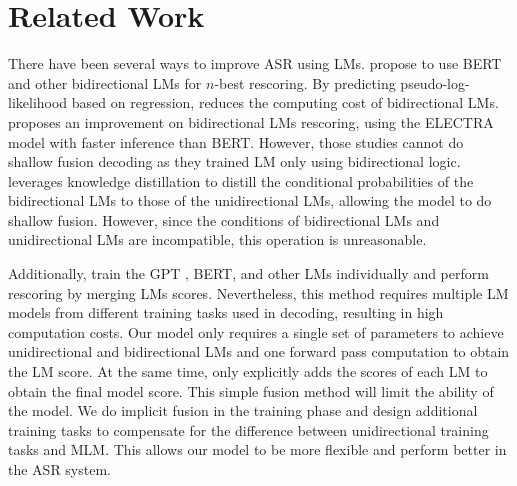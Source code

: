 \section{Related Work}
There have been several ways to improve ASR using LMs. \cite{ref39,ref50} propose to use BERT \cite{ref7} and other bidirectional LMs for $n$-best rescoring. By predicting pseudo-log-likelihood based on regression, \cite{ref38} reduces the computing cost of bidirectional LMs. \cite{ref9} proposes an improvement on bidirectional LMs rescoring, using the ELECTRA model with faster inference than BERT. However, those studies cannot do shallow fusion decoding as they trained LM only using bidirectional logic. \cite{ref12} leverages knowledge distillation to distill the conditional probabilities of the bidirectional LMs to those of the unidirectional LMs, allowing the model to do shallow fusion. However, since the conditions of bidirectional LMs and unidirectional LMs are incompatible, this operation is unreasonable.


Additionally, \cite{ref5} train the GPT \cite{ref16}, BERT, and other LMs individually and perform rescoring by merging LMs scores. Nevertheless, this method requires multiple LM models from different training tasks used in decoding, resulting in high computation costs. Our model only requires a single set of parameters to achieve unidirectional and bidirectional LMs and one forward pass computation to obtain the LM score. At the same time, \cite{ref5} only explicitly adds the scores of each LM to obtain the final model score. This simple fusion method will limit the ability of the model. We do implicit fusion in the training phase and design additional training tasks to compensate for the difference between unidirectional training tasks and MLM. This allows our model to be more flexible and perform better in the ASR system.